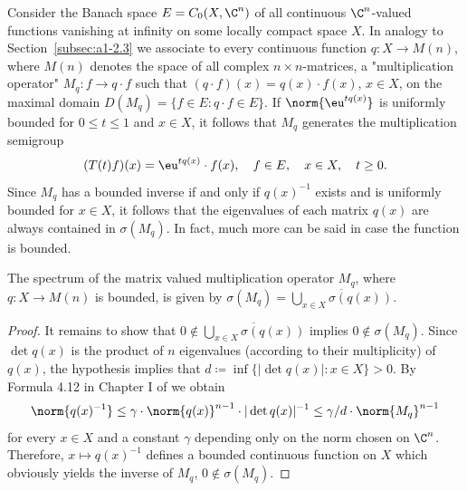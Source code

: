 Consider the Banach space $E = C_{0}(X,\C^{n})$ of all continuous $\C^{n}$-valued functions vanishing at infinity on some locally compact space $X$.
In analogy to Section~\ref{subsec:a1-2.3} we associate to every continuous function $q \colon X \to M(n)$, where $M(n)$ denotes the space of all complex $n\times n$-matrices, a "multiplication operator" $M_{q} \colon f \to q\cdot f$ such that $(q\cdot f)(x) = q(x)\cdot f(x)$, $x \in X$, on the maximal domain $D(M_{q}) = \{f \in E \colon q\cdot f \in E\}$.
If\/ $\norm{\eu^{tq(x)}}$ is uniformly bounded for $0 \leq t \leq 1$ and $x \in X$, it follows that $M_{q}$ generates the multiplication semigroup
\[
	(T(t)f)(x) = \eu^{tq(x)}\cdot f(x), \quad f \in E, \quad x \in X, \quad t \geq 0 .
\]
Since $M_{q}$ has a bounded inverse if and only if\/ $q(x)^{-1}$ exists and is uniformly bounded for $x \in X$, it follows that the eigenvalues of each matrix $q(x)$ are always contained in $\sigma(M_{q})$.
In fact, much more can be said in case the function is bounded.
\begin{lemma}\label{lem:a3-7.1}
The spectrum of the matrix valued multiplication operator $M_{q}$, where $q \colon X \to M(n)$ is bounded, is given by $\sigma(M_{q}) = \overline{\bigcup_{x\in X} \sigma(q(x))}$.
\end{lemma}
\begin{proof}
It remains to show that $0 \notin \overline{\bigcup_{x\in X} \sigma(q(x))}$ implies $0 \notin \sigma(M_{q})$.
Since $\det q(x)$ is the product of\/ $n$ eigenvalues (according to their multiplicity) of\/ $q(x)$, the hypothesis implies that $d \coloneqq \inf\{|\det q(x)| \colon x \in X\} > 0$.
By Formula 4.12 in Chapter I of \textcite{kato:1976} we obtain
\[
\norm{q(x)^{-1}} \leq \gamma \cdot \norm{q(x)}^{n-1} \cdot |\det q(x)|^{-1} \leq \gamma/d \cdot \norm{M_{q}}^{n-1}
\]
for every $x \in X$ and a constant $\gamma$ depending only on the norm chosen on $\C^{n}$.
Therefore, $x \mapsto q(x)^{-1}$ defines a bounded continuous function on $X$ which obviously yields the inverse of\/ $M_{q}$, \ie $0 \notin \sigma(M_{q})$.
\end{proof}

